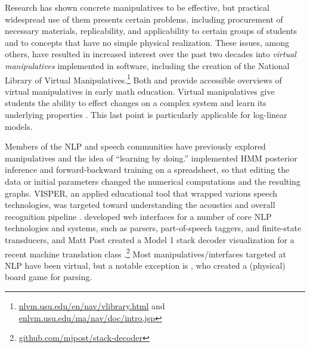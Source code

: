 \documentclass[11pt,letterpaper]{article}
\newcommand{\Note}[1]{}
\renewcommand{\Note}[1]{\hl{[#1]}}  %
\newcommand{\NoteSigned}[3]{{\sethlcolor{#2}\Note{#1: #3}}}
\newcommand{\NoteFF}[1]{\NoteSigned{FF}{LightBlue}{#1}}
\newcommand{\NoteJE}[1]{\NoteSigned{JE}{LightGreen}{#1}}
\newcommand{\Commented}[1]{#1}
\begin{document}
Research has shown concrete manipulatives to be effective, but practical widespread use of them presents certain 
problems, including procurement of necessary materials, replicability,
and applicability to certain groups of students and to concepts
that have no simple physical realization. These issues, among others, have 
resulted in increased interest over the past two decades into
\textit{virtual manipulatives} implemented in software, including the creation of 
the National Library of Virtual Manipulatives.\footnote{\url{nlvm.usu.edu/en/nav/vlibrary.html} and 
\url{enlvm.usu.edu/ma/nav/doc/intro.jsp}} 
Both  and  provide accessible overviews of 
virtual manipulatives in early math education. 
Virtual manipulatives give students the ability to effect changes on a complex system and learn its underlying 
properties \cite{moyer2002virtual}. This last point is particularly applicable for log-linear models.



Members of the NLP and speech communities have previously explored manipulatives and the idea of
``learning by doing.''
 implemented HMM posterior inference and
forward-backward training on a spreadsheet, so that editing the data or initial parameters
changed the numerical computations and the resulting graphs.  
VISPER, an applied educational tool that wrapped various speech technologies, 
was targeted toward understanding the acoustics and overall recognition pipeline 
\cite{nouza1997educational,nouza1999teaching} . 
 developed web interfaces for a number of core NLP technologies and systems, such as parsers, part-of-speech 
taggers, and finite-state transducers, and Matt Post created a Model 1 stack decoder visualization for a recent machine translation class \cite{lopez2013learning}.\footnote{\url{github.com/mjpost/stack-decoder}}
Most manipulatives/interfaces targeted at NLP have been virtual, but a notable exception is , 
who created a (physical) board game for parsing. 
\end{document}
